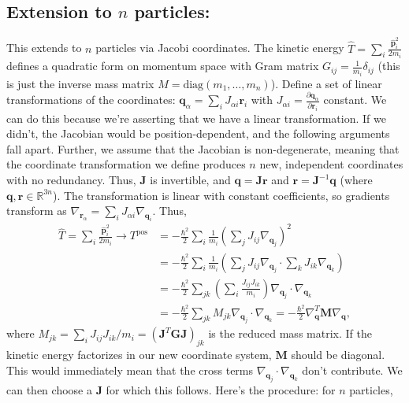 \subsection{\texorpdfstring{Extension to $n$ particles:}{Extension to n particles:}}
This extends to $n$ particles via Jacobi coordinates. The kinetic energy $\hat{T}=\sum_i \frac{\hat{\mathbf{p}}_i^2}{2m_i}$ defines a quadratic form on momentum space with Gram matrix $G_{ij}=\frac{1}{m_i}\delta_{ij}$ (this is just the inverse mass matrix $M=\text{diag}(m_1, \dots, m_n)$). Define a set of linear transformations of the coordinates: $\mathbf{q}_\alpha=\sum_i J_{\alpha i}\mathbf{r}_i$ with $J_{\alpha i} = \frac{\partial \mathbf{q}_\alpha}{\partial \mathbf{r}_i}$ constant. We can do this because we're asserting that we have a linear transformation. If we didn't, the Jacobian would be position-dependent, and the following arguments fall apart. Further, we assume that the Jacobian is non-degenerate, meaning that the coordinate transformation we define produces $n$ new, independent coordinates with no redundancy. Thus, $\mathbf{J}$ is invertible, and $\mathbf{q}=\mathbf{J r}$ and $\mathbf{r}=\mathbf{J}^{-1}\mathbf{q}$ (where $\mathbf{q},\mathbf{r}\in\mathbb{R}^{3n}$). The transformation is linear with constant coefficients, so gradients transform as $\nabla_{\mathbf{r}_\alpha}=\sum_i J_{\alpha i} \nabla_{\mathbf{q}_i}$. Thus,
\begin{align*}
    \hat{T}=\sum_i \frac{\hat{\mathbf{p}}_i^2}{2m_i} \rightarrow T^\text{pos}&= -\frac{\hbar^2}{2}\sum_i\frac{1}{m_i}\left(\sum_j J_{ij} \nabla_{\mathbf{q}_j}\right)^2\\
    &=-\frac{\hbar^2}{2}\sum_i \frac{1}{m_i}\left( \sum_{j} J_{ij}\nabla_{\mathbf{q}_j}\cdot\sum_k J_{ik}\nabla_{\mathbf{q}_k}\right)\\
    &= -\frac{\hbar^2}{2}\sum_{jk}\left(\sum_i \frac{J_{ij}J_{ik}}{m_i} \right)\nabla_{\mathbf{q}_j}\cdot\nabla_{\mathbf{q}_k}\\
    &= -\frac{\hbar^2}{2}\sum_{jk} M_{jk}\nabla_{\mathbf{q}_j}\cdot\nabla_{\mathbf{q}_k}= -\frac{\hbar^2}{2} \nabla_{\mathbf{q}}^T\mathbf{M}\nabla_{\mathbf{q}},
\end{align*}
where $M_{jk}=\sum_iJ_{ij}J_{ik}/m_i=(\mathbf{J}^T \mathbf{G J})_{jk}$ is the reduced mass matrix. If the kinetic energy factorizes in our new coordinate system, $\mathbf{M}$ should be diagonal. This would immediately mean that the cross terms $\nabla_{\mathbf{q}_j}\cdot\nabla_{\mathbf{q}_k}$ don't contribute. We can then choose a $\mathbf{J}$ for which this follows. Here's the procedure: for $n$ particles,
